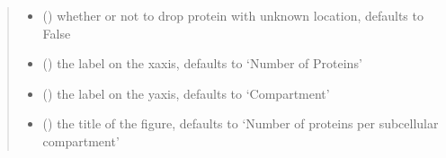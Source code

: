 \documentclass[letterpaper,10pt,english]{sphinxmanual}
\begin{document}
\begin{fulllineitems}
\begin{quote}
\begin{description}
\begin{itemize}
\item {} 
 (\sphinxstyleliteralemphasis{\sphinxupquote{, }}) \textendash{} whether or not to drop protein with unknown location, defaults to False

\item {} 
 (\sphinxstyleliteralemphasis{\sphinxupquote{, }}) \textendash{} the label on the x\sphinxhyphen{}axis, defaults to ‘Number of Proteins’

\item {} 
 (\sphinxstyleliteralemphasis{\sphinxupquote{, }}) \textendash{} the label on the y\sphinxhyphen{}axis, defaults to ‘Compartment’

\item {} 
 (\sphinxstyleliteralemphasis{\sphinxupquote{, }}) \textendash{} the title of the figure, defaults to ‘Number of proteins per sub\sphinxhyphen{}cellular compartment’

\end{itemize}

\end{description}\end{quote}

\end{fulllineitems}

\end{document}
